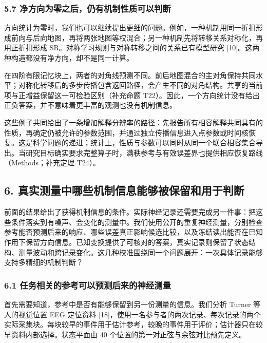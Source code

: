 \documentclass[11pt,a4paper]{article}
\begin{document}
\subsubsection{5.7
净方向为零之后，仍有机制性质可以判断}\label{ux51c0ux65b9ux5411ux4e3aux96f6ux4e4bux540eux4ecdux6709ux673aux5236ux6027ux8d28ux53efux4ee5ux5224ux65ad}

方向统计为零时，我们也可以继续提出更细的问题。例如，一种机制用同一折扣形成前向与后向地图，再将两张地图等权混合；另一种机制先将转移关系对称化，再用正折扣形成
SR。对称学习规则与对称转移之间的关系已有模型研究
{[}10{]}。这两种构造都没有净方向，却不是同一计算。

在四阶有限记忆块上，两者的对角线预测不同。前后地图混合的主对角保持共同水平；对称化转移后的多步传播包含返回路径，会产生不同的对角结构。共享的当前项与正增益保留这一可检验区别（补充命题
T22）。因此，一个方向统计没有给出正负答案，并不意味着更丰富的观测也没有机制信息。

这些例子共同给出了一条增加解释分辨率的路径：先报告所有相容解释共同具有的性质，再确定仍被允许的参数范围，并通过独立传播信息进入点参数或时间核恢复。这是科学问题的递进；统计上，性质与参数可以同时从同一个联合相容集合导出。当研究目标确实要求完整算子时，满秩参考与有效误差界也提供相应恢复路线（Methods；补充定理
T24）。

\subsection{6.
真实测量中哪些机制信息能够被保留和用于判断}\label{ux771fux5b9eux6d4bux91cfux4e2dux54eaux4e9bux673aux5236ux4fe1ux606fux80fdux591fux88abux4fddux7559ux548cux7528ux4e8eux5224ux65ad}

前面的结果给出了获得机制信息的条件。实际神经记录还需要完成另一件事：把这些条件落实到有噪声、会变化的测量中。我们使用公开的重复神经测量，分别检查参考能否预测后来的响应、哪些误差真正影响候选比较，以及冻结读出能否在已知作用下保留方向信息。已知变换提供了可核对的答案，真实记录则保留了状态结构、测量波动和跨记录变化。这几种校准围绕同一个问题展开：一次具体记录能够支持多精细的机制判断？

\subsubsection{6.1
任务相关的参考可以预测后来的神经测量}\label{ux4efbux52a1ux76f8ux5173ux7684ux53c2ux8003ux53efux4ee5ux9884ux6d4bux540eux6765ux7684ux795eux7ecfux6d4bux91cf}

首先需要知道，参考中是否有能够保留到另一份测量的信息。我们分析 Turner
等人的视觉位置 EEG 定位资料
{[}18{]}，使用一名参与者的两次记录、每次记录的两个实际采集块。每块较早的事件用于估计参考，较晚的事件用于评价；估计器只在较早资料内部选择。状态平面由
40 个位置的第一对正弦与余弦对比预先定义。
\end{document}
